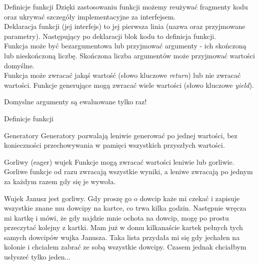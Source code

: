 \begin{frame}{Definicje funkcji}
    Dzięki zastosowaniu funkcji możemy reużywać fragmenty kodu oraz ukrywać szczegóły implementacyjne za interfejsem. \\
    Deklaracja funkcji (jej interfejs) to jej pierwsza linia (nazwa oraz przyjmowane parametry). Następujący po deklaracji blok kodu to definicja funkcji. \\
    Funkcja może być bezargumentowa lub przyjmować argumenty - ich skończoną lub nieskończoną liczbę. Skończona liczba argumentów może przyjmować wartości domyślne. \\
    Funkcja może zwracać jakąś wartość (słowo kluczowe \emph{return}) lub nie zwracać wartości. Funkcje generujące mogą zwracać wiele wartości (słowo kluczowe \emph{yield}). \\
    \begin{alertblock}{}
        Domyslne argumenty są ewaluowane tylko raz!
    \end{alertblock}
\end{frame}

\begin{frame}{Definicje funkcji}
    
\end{frame}

\begin{frame}{Generatory}
    Generatory pozwalają leniwie generować po jednej wartości, bez konieczności przechowywania w pamięci wszystkich przyszłych wartości. \\
    
\end{frame}

\begin{frame}{Gorliwy (eager) wujek}
    Funkcje mogą zwracać wartości leniwie lub gorliwie. Gorliwe funkcje od razu zwracają wszystkie wyniki, a leniwe zwracają po jednym za każdym razem gdy się je wywoła. \\
    \begin{exampleblock}{}
       Wujek Janusz jest gorliwy. Gdy proszę go o dowcip każe mi czekać i zapisuje wszystkie znane mu dowcipy na kartce, co trwa kilka godzin. Następnie wręcza mi kartkę i mówi, że gdy najdzie mnie ochota na dowcip, mogę po prostu przeczytać kolejny z kartki. Mam już w domu kilkanaście kartek pełnych tych samych dowcipów wujka Janusza. Taka lista przydała mi się gdy jechałen na kolonie i chciałem zabrać ze sobą wszystkie dowcipy. Czasem jednak chciałbym usłyszeć tylko jeden...
    \end{exampleblock}
\end{frame}

